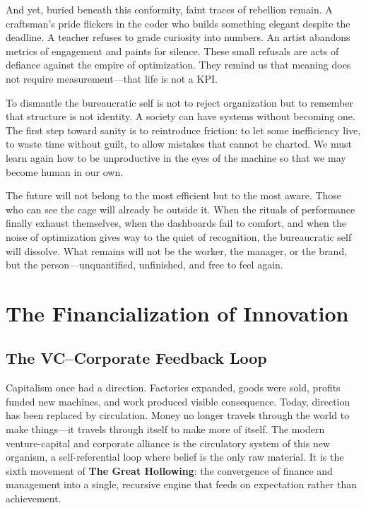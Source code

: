 \documentclass[11pt,twoside]{book}
\begin{document}
And yet, buried beneath this conformity, faint traces of rebellion remain.  A craftsman’s pride flickers in the coder who builds something elegant despite the deadline.  A teacher refuses to grade curiosity into numbers.  An artist abandons metrics of engagement and paints for silence.  These small refusals are acts of defiance against the empire of optimization.  They remind us that meaning does not require measurement—that life is not a KPI.

To dismantle the bureaucratic self is not to reject organization but to remember that structure is not identity.  A society can have systems without becoming one.  The first step toward sanity is to reintroduce friction: to let some inefficiency live, to waste time without guilt, to allow mistakes that cannot be charted.  We must learn again how to be unproductive in the eyes of the machine so that we may become human in our own.

The future will not belong to the most efficient but to the most aware.  Those who can see the cage will already be outside it.  When the rituals of performance finally exhaust themselves, when the dashboards fail to comfort, and when the noise of optimization gives way to the quiet of recognition, the bureaucratic self will dissolve.  What remains will not be the worker, the manager, or the brand, but the person—unquantified, unfinished, and free to feel again.

\part{The Financialization of Innovation}

\chapter{The VC–Corporate Feedback Loop}
\label{ch:06}

Capitalism once had a direction.  Factories expanded, goods were sold, profits funded new machines, and work produced visible consequence.  Today, direction has been replaced by circulation.  Money no longer travels through the world to make things—it travels through itself to make more of itself.  The modern venture-capital and corporate alliance is the circulatory system of this new organism, a self-referential loop where belief is the only raw material.  It is the sixth movement of \textbf{The Great Hollowing}: the convergence of finance and management into a single, recursive engine that feeds on expectation rather than achievement.
\end{document}
